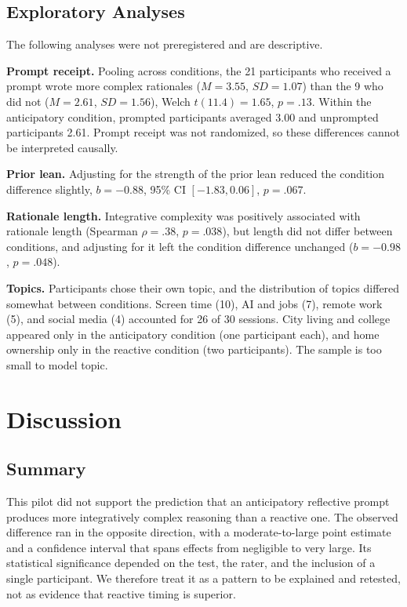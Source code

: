 \documentclass[12pt,letterpaper]{article}
\begin{document}
\subsection{Exploratory Analyses}
The following analyses were not preregistered and are descriptive.

\textbf{Prompt receipt.} Pooling across conditions, the 21 participants who received a prompt wrote more complex rationales ($M = 3.55$, $SD = 1.07$) than the 9 who did not ($M = 2.61$, $SD = 1.56$), Welch $t(11.4) = 1.65$, $p = .13$. Within the anticipatory condition, prompted participants averaged 3.00 and unprompted participants 2.61. Prompt receipt was not randomized, so these differences cannot be interpreted causally.

\textbf{Prior lean.} Adjusting for the strength of the prior lean reduced the condition difference slightly, $b = -0.88$, 95\% CI $[-1.83, 0.06]$, $p = .067$.

\textbf{Rationale length.} Integrative complexity was positively associated with rationale length (Spearman $\rho = .38$, $p = .038$), but length did not differ between conditions, and adjusting for it left the condition difference unchanged ($b = -0.98$, $p = .048$).

\textbf{Topics.} Participants chose their own topic, and the distribution of topics differed somewhat between conditions. Screen time (10), AI and jobs (7), remote work (5), and social media (4) accounted for 26 of 30 sessions. City living and college appeared only in the anticipatory condition (one participant each), and home ownership only in the reactive condition (two participants). The sample is too small to model topic.

\section{Discussion}
\subsection{Summary}
This pilot did not support the prediction that an anticipatory reflective prompt produces more integratively complex reasoning than a reactive one. The observed difference ran in the opposite direction, with a moderate-to-large point estimate and a confidence interval that spans effects from negligible to very large. Its statistical significance depended on the test, the rater, and the inclusion of a single participant. We therefore treat it as a pattern to be explained and retested, not as evidence that reactive timing is superior.
\end{document}
